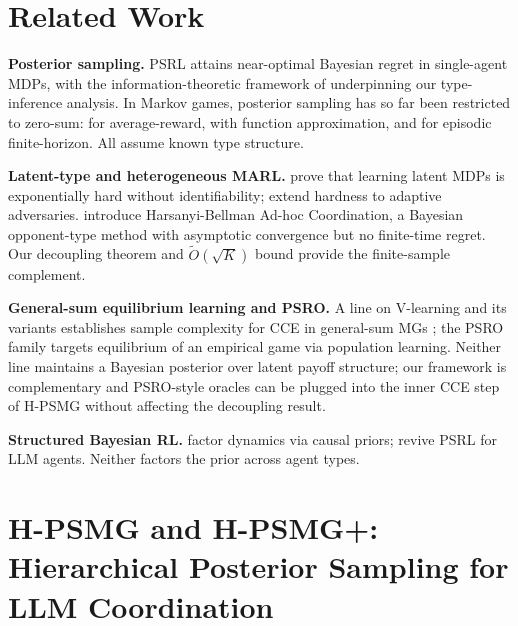 ﻿\documentclass{article}
\def\textsuperscript#1{#1}%
\begin{document}
\section{Related Work}
\label{sec:related}

\textbf{Posterior sampling.} PSRL \citep{strens2000bayesian,osband2013more,agrawal2017optimistic,ouyang2017learning} attains near-optimal Bayesian regret in single-agent MDPs, with the information-theoretic framework of \citet{russo2014learning,russo2016information} underpinning our type-inference analysis. In Markov games, posterior sampling has so far been restricted to zero-sum: \citet{jafarnia2021learning} for average-reward, \citet{xiong2022self} with function approximation, and \citet{yueh2026bayesian} for episodic finite-horizon. All assume known type structure.

\textbf{Latent-type and heterogeneous MARL.} \citet{kwon2021rl} prove that learning latent MDPs is exponentially hard without identifiability; \citet{tian2024learning} extend hardness to adaptive adversaries. \citet{albrecht2013game,albrecht2019convergence} introduce Harsanyi-Bellman Ad-hoc Coordination, a Bayesian opponent-type method with asymptotic convergence but no finite-time regret. Our decoupling theorem and $\tilde O(\sqrt K)$ bound provide the finite-sample complement.

\textbf{General-sum equilibrium learning and PSRO.} A line on V-learning and its variants establishes sample complexity for CCE in general-sum MGs \citep{jin2021v,song2022when,mao2023decentralized,erez2023regret,cui2025incentivize}; the PSRO family \citep{lanctot2017unified,muller2019generalized,mcaleer2020pipeline,marris2021multi,mcaleer2021xdo,mcaleer2022anytime,dinh2022online,zhou2022efficient,yao2023policy} targets equilibrium of an empirical game via population learning. Neither line maintains a Bayesian posterior over latent payoff structure; our framework is complementary and PSRO-style oracles can be plugged into the inner CCE step of H-PSMG without affecting the decoupling result.

\textbf{Structured Bayesian RL.} \citet{mutti2024exploiting} factor dynamics via causal priors; \citet{arumugam2026toward} revive PSRL for LLM agents. Neither factors the prior across agent types.

\section{H-PSMG and H-PSMG\textsuperscript{+}: Hierarchical Posterior Sampling for LLM Coordination}
\label{sec:algorithm}
\end{document}
